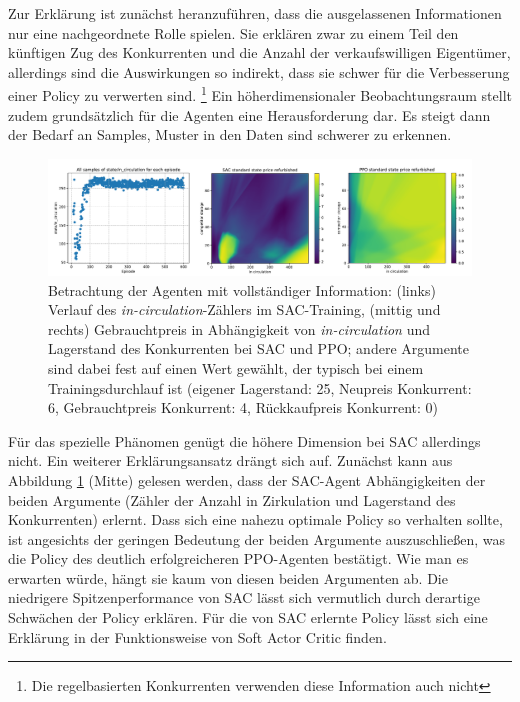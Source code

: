 Zur Erklärung ist zunächst heranzuführen, dass die ausgelassenen Informationen nur eine nachgeordnete Rolle spielen.
Sie erklären zwar zu einem Teil den künftigen Zug des Konkurrenten und die Anzahl der verkaufswilligen Eigentümer, allerdings sind die Auswirkungen so indirekt, dass sie schwer für die Verbesserung einer Policy zu verwerten sind. \footnote{Die regelbasierten Konkurrenten verwenden diese Information auch nicht}
Ein höherdimensionaler Beobachtungsraum stellt zudem grundsätzlich für die Agenten eine Herausforderung dar.
Es steigt dann der Bedarf an Samples, Muster in den Daten sind schwerer zu erkennen.

\begin{figure}[htbp]
	\centering
	\includegraphics[width=\textwidth]{main/sac_in_circulation_dependend_explanation.pdf}
	\caption{Betrachtung der Agenten mit vollständiger Information: (links) Verlauf des \textit{in-circulation}-Zählers im SAC-Training, (mittig und rechts) Gebrauchtpreis in Abhängigkeit von \textit{in-circulation} und Lagerstand des Konkurrenten bei SAC und PPO; andere Argumente sind dabei fest auf einen Wert gewählt, der typisch bei einem Trainingsdurchlauf ist (eigener Lagerstand: 25, Neupreis Konkurrent: 6, Gebrauchtpreis Konkurrent: 4, Rückkaufpreis Konkurrent: 0)}
	\label{graphic:InCirculationExplain}
\end{figure}
Für das spezielle Phänomen genügt die höhere Dimension bei SAC allerdings nicht.
Ein weiterer Erklärungsansatz drängt sich auf.
Zunächst kann aus Abbildung \ref{graphic:InCirculationExplain} (Mitte) gelesen werden, dass der SAC-Agent Abhängigkeiten der beiden Argumente (Zähler der Anzahl in Zirkulation und Lagerstand des Konkurrenten) erlernt.
Dass sich eine nahezu optimale Policy so verhalten sollte, ist angesichts der geringen Bedeutung der beiden Argumente auszuschließen, was die Policy des deutlich erfolgreicheren PPO-Agenten bestätigt.
Wie man es erwarten würde, hängt sie kaum von diesen beiden Argumenten ab.
Die niedrigere Spitzenperformance von SAC lässt sich vermutlich durch derartige Schwächen der Policy erklären.
Für die von SAC erlernte Policy lässt sich eine Erklärung in der Funktionsweise von Soft Actor Critic finden.
